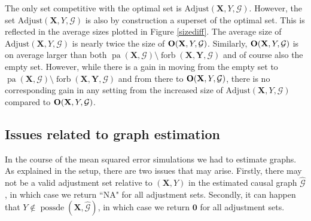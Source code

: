 \documentclass[11pt,a4paper]{article}
\theoremstyle{definition}
\theoremstyle{remark}
\DeclareMathOperator{\Forbb}{forb}
\DeclareMathOperator{\pa}{pa}
\DeclareMathOperator{\possde}{possde}
\newcommand{\g}[1][G]{\mathcal{#1}}
\newcommand{\fb}[2][X,Y]{\Forbb(\mathbf{#1},#2)}
\begin{document}


The only set competitive with the optimal set is $\textrm{Adjust}(\mathbf{X},Y,\g)$. However, the set  $\textrm{Adjust}(\mathbf{X},Y,\g)$ is also by construction a superset of the optimal set.  This is reflected in the average sizes plotted in Figure \ref{sizediff}. The average size of $\textrm{Adjust}(\mathbf{X},Y,\g)$ is nearly twice the size of $\text{\textbf{O}}(\mathbf{X},Y,\g)$. Similarly, $\text{\textbf{O}}(\mathbf{X},Y,\g)$ is on average larger than both $\pa(\mathbf{X},\g) \setminus \fb{\g}$ and of course also the empty set. However, while there is a gain in moving from the empty set to $\pa(\mathbf{X},\g) \setminus \fb{\g}$ and from there  to $\text{\textbf{O}}(\mathbf{X},Y,\g)$, there is no corresponding gain in any setting from the increased size of $\textrm{Adjust}(\mathbf{X},Y,\g)$ compared to $\text{\textbf{O}}(\mathbf{X},Y,\g)$.


\subsection{Issues related to graph estimation}

\label{graphIssues}


In the course of the mean squared error simulations we had to estimate graphs. As explained in the setup, there are two issues that may arise. 
Firstly, there may not be a valid adjustment set relative to $(\mathbf{X},Y)$ in the estimated causal graph $\widehat{\g}$, in which case we return ``NA" for all adjustment sets. Secondly, it can happen that $Y \notin \possde(\mathbf{X},\widehat{\g})$, in which case we return $\boldsymbol{0}$ for all adjustment sets. 
\end{document}
